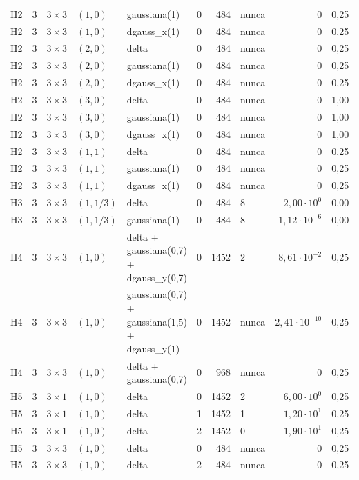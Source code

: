 \begin{tabular}{llllllrlrr}
H2 & 3 & $3\times3$ & $(1, 0)$ & gaussiana(1) & 0 & 484 & nunca & $0$ & 0,25 \\
H2 & 3 & $3\times3$ & $(1, 0)$ & dgauss\_x(1) & 0 & 484 & nunca & $0$ & 0,25 \\
H2 & 3 & $3\times3$ & $(2, 0)$ & delta & 0 & 484 & nunca & $0$ & 0,25 \\
H2 & 3 & $3\times3$ & $(2, 0)$ & gaussiana(1) & 0 & 484 & nunca & $0$ & 0,25 \\
H2 & 3 & $3\times3$ & $(2, 0)$ & dgauss\_x(1) & 0 & 484 & nunca & $0$ & 0,25 \\
H2 & 3 & $3\times3$ & $(3, 0)$ & delta & 0 & 484 & nunca & $0$ & 1,00 \\
H2 & 3 & $3\times3$ & $(3, 0)$ & gaussiana(1) & 0 & 484 & nunca & $0$ & 1,00 \\
H2 & 3 & $3\times3$ & $(3, 0)$ & dgauss\_x(1) & 0 & 484 & nunca & $0$ & 1,00 \\
H2 & 3 & $3\times3$ & $(1, 1)$ & delta & 0 & 484 & nunca & $0$ & 0,25 \\
H2 & 3 & $3\times3$ & $(1, 1)$ & gaussiana(1) & 0 & 484 & nunca & $0$ & 0,25 \\
H2 & 3 & $3\times3$ & $(1, 1)$ & dgauss\_x(1) & 0 & 484 & nunca & $0$ & 0,25 \\
H3 & 3 & $3\times3$ & $(1, 1/3)$ & delta & 0 & 484 & 8 & $2{,}00 \cdot 10^{0}$ & 0,00 \\
H3 & 3 & $3\times3$ & $(1, 1/3)$ & gaussiana(1) & 0 & 484 & 8 & $1{,}12 \cdot 10^{-6}$ & 0,00 \\
H4 & 3 & $3\times3$ & $(1, 0)$ & delta + gaussiana(0,7) + dgauss\_y(0,7) & 0 & 1452 & 2 & $8{,}61 \cdot 10^{-2}$ & 0,25 \\
H4 & 3 & $3\times3$ & $(1, 0)$ & gaussiana(0,7) + gaussiana(1,5) + dgauss\_y(1) & 0 & 1452 & nunca & $2{,}41 \cdot 10^{-10}$ & 0,25 \\
H4 & 3 & $3\times3$ & $(1, 0)$ & delta + gaussiana(0,7) & 0 & 968 & nunca & $0$ & 0,25 \\
H5 & 3 & $3\times1$ & $(1, 0)$ & delta & 0 & 1452 & 2 & $6{,}00 \cdot 10^{0}$ & 0,25 \\
H5 & 3 & $3\times1$ & $(1, 0)$ & delta & 1 & 1452 & 1 & $1{,}20 \cdot 10^{1}$ & 0,25 \\
H5 & 3 & $3\times1$ & $(1, 0)$ & delta & 2 & 1452 & 0 & $1{,}90 \cdot 10^{1}$ & 0,25 \\
H5 & 3 & $3\times3$ & $(1, 0)$ & delta & 0 & 484 & nunca & $0$ & 0,25 \\
H5 & 3 & $3\times3$ & $(1, 0)$ & delta & 2 & 484 & nunca & $0$ & 0,25 \\

\end{tabular}
